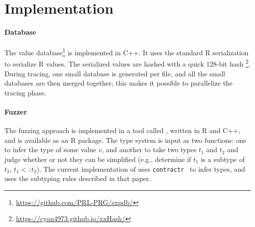 \section{Implementation}

\paragraph{Database}
The value database\footnote{\url{https://github.com/PRL-PRG/sxpdb/}  } is implemented in C++. 
It uses the standard R serialization to serialize R values. 
The serialized values are hashed with a quick 128-bit hash \footnote{\url{https://cyan4973.github.io/xxHash/}}. 
During tracing, one small database is generated per file, and all the small databases are then merged together; this makes it possible to parallelize the tracing phase.

\paragraph{Fuzzer}
The fuzzing approach is implemented in a tool called \tool, written in R and C++, and is available as an R package.
The type system is input as two functions: one to infer the type of some value $v$, and another to take two types $t_1$ and $t_2$ and judge whether or not they can be simplified (e.g., determine if $t_1$ is a subtype of $t_2$, $t_1 <: t_2$). 
The current implementation of \tool uses {\tt contractr}~\cite{turcotte2020designing} to infer types, and uses the subtyping rules described in that paper.
 

